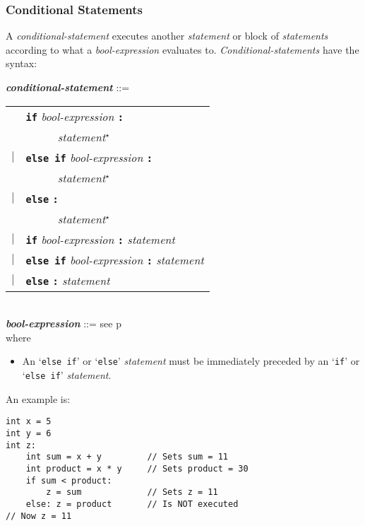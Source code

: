 \documentclass[12pt]{article}
\newcommand{\TT}[1]{{\tt \bfseries #1}}
\newcommand{\STAR}{{\Large $^\star$}}
\newcommand{\ttkey}[1]{{\tt \bfseries #1}}
\newcommand{\emkey}[1]{{\em \bfseries #1}}
\newcommand{\pagref}[1]{p\pageref{#1}}
\newenvironment{indpar}[1][0.3in]%
	{\begin{list}{}%
		     {\setlength{\itemsep}{0in}%
		      \setlength{\topsep}{0in}%
		      \setlength{\parsep}{1ex}%
		      \setlength{\labelwidth}{#1}%
		      \setlength{\leftmargin}{#1}%
		      \addtolength{\leftmargin}{\labelsep}}%
	 \item}%
	{\end{list}}
\begin{document}
\subsubsection{Conditional Statements}
\label{CONDITIONAL-STATEMENTS}

A {\em conditional-statement} executes another {\em statement}
or block of {\em statements} according to what a
{\em bool-expression} evaluates to.
{\em Conditional-statements} have the syntax:

\begin{indpar}
\emkey{conditional-statement} ::= \\
\hspace*{0.5in}\begin{tabular}[t]{rl}
        & \ttkey{if} {\em bool-expression} \TT{:} \\
	& ~~~~~ {\em statement}\STAR{} \\
    $|$ & \ttkey{else if} {\em bool-expression} \TT{:} \\
	& ~~~~~ {\em statement}\STAR{} \\
    $|$ & \ttkey{else} \TT{:} \\
	& ~~~~~ {\em statement}\STAR{} \\
    $|$ & \ttkey{if} {\em bool-expression} \TT{:} {\em statement} \\
    $|$ & \ttkey{else if} {\em bool-expression} \TT{:} {\em statement} \\
    $|$ & \ttkey{else} \TT{:} {\em statement} \\
	\end{tabular}
\\[0.5ex]
\emkey{bool-expression} ::= see \pagref{BOOL-EXPRESSION}
\\[1ex]
where
\begin{itemize}
\item An `{\tt else if}' or `{\tt else}' {\em statement} must be immediately
preceded by an `{\tt if}' or `{\tt else if}' {\em statement}.
\end{itemize}
\end{indpar}

An example is:
\begin{indpar}\begin{verbatim}
int x = 5
int y = 6
int z:
    int sum = x + y         // Sets sum = 11
    int product = x * y     // Sets product = 30
    if sum < product:
        z = sum             // Sets z = 11
    else: z = product       // Is NOT executed
// Now z = 11
\end{verbatim}\end{indpar}
\end{document}
